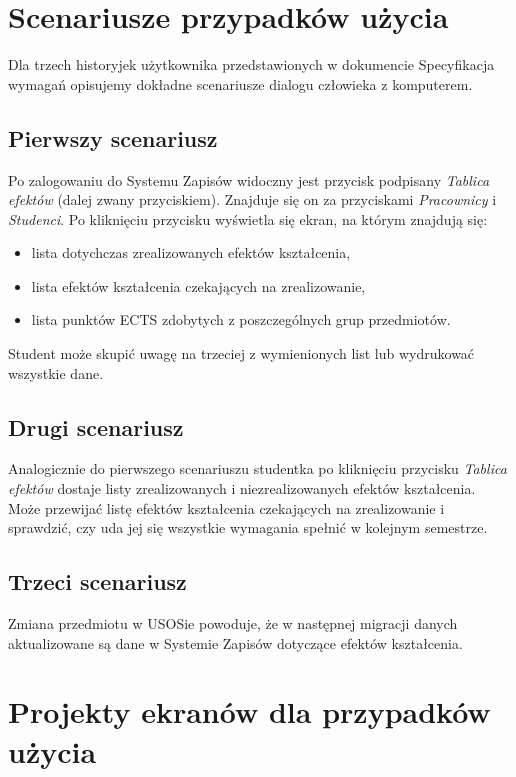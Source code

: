 \documentclass{article}
\begin{document}
\section{Scenariusze przypadków użycia}
Dla trzech historyjek użytkownika przedstawionych w dokumencie Specyfikacja wymagań opisujemy dokładne scenariusze dialogu człowieka z komputerem.

\subsection{Pierwszy scenariusz}
Po zalogowaniu do Systemu Zapisów widoczny jest przycisk podpisany \textit{Tablica efektów} (dalej zwany przyciskiem). 
Znajduje się on za przyciskami \textit{Pracownicy} i \textit{Studenci}. Po kliknięciu przycisku wyświetla się ekran, na którym znajdują się:
\begin{itemize}
	\item lista dotychczas zrealizowanych efektów kształcenia,
	\item lista efektów kształcenia czekających na zrealizowanie,
	\item lista punktów ECTS zdobytych z poszczególnych grup przedmiotów.
\end{itemize}
Student może skupić uwagę na trzeciej z wymienionych list lub wydrukować wszystkie dane.

\subsection{Drugi scenariusz}
Analogicznie do pierwszego scenariuszu studentka po kliknięciu przycisku \textit{Tablica efektów} dostaje listy zrealizowanych i niezrealizowanych efektów kształcenia.
Może przewijać listę efektów kształcenia czekających na zrealizowanie i sprawdzić, czy uda jej się wszystkie wymagania spełnić w kolejnym semestrze.

\subsection{Trzeci scenariusz}
Zmiana przedmiotu w USOSie powoduje, że w następnej migracji danych aktualizowane są dane w Systemie Zapisów dotyczące efektów kształcenia.

\newpage

\section{Projekty ekranów dla przypadków użycia}
\end{document}
